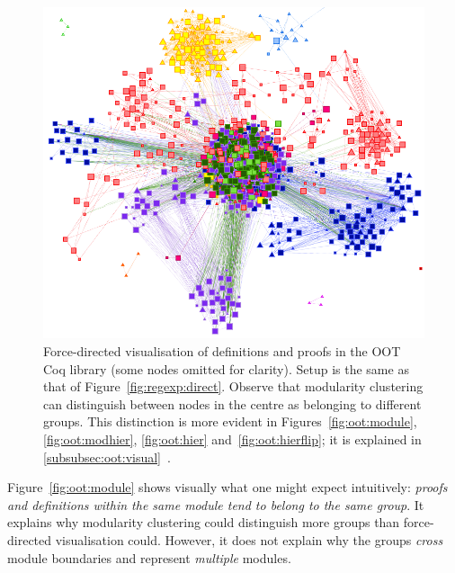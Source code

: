 \begin{figure}[tp]
\centering
\includegraphics[height=0.35\textheight]{img/oot/direct}
\caption{Force-directed visualisation of definitions and proofs in the OOT Coq
  library (some nodes omitted for clarity). Setup is the same as that of
  Figure~\ref{fig:regexp:direct}. Observe that modularity clustering can
  distinguish between nodes in the centre as belonging to different groups. This
  distinction is more evident in Figures~\ref{fig:oot:module},
  \ref{fig:oot:modhier}, \ref{fig:oot:hier}
  and~\ref{fig:oot:hierflip}; it is explained in
  \ref{subsubsec:oot:visual}~.}\label{fig:oot:direct}
\end{figure}

Figure~\ref{fig:oot:module} shows visually what one might expect intuitively:
\emph{proofs and definitions within the same module tend to belong to the same
group}. It explains why modularity clustering could distinguish more groups than
force-directed visualisation could. However, it does not explain why the groups
\emph{cross} module boundaries and represent \emph{multiple} modules.

